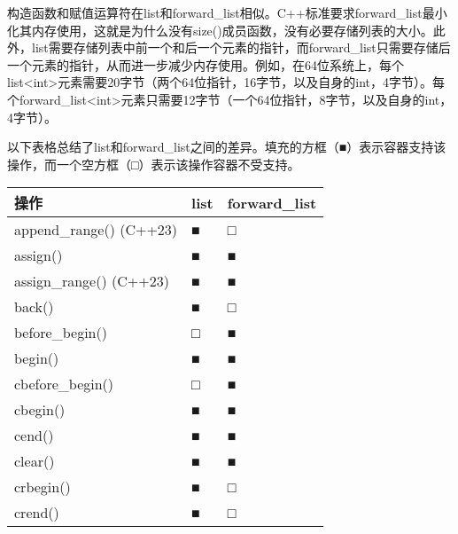 构造函数和赋值运算符在list和forward\_list相似。C++标准要求forward\_list最小化其内存使用，这就是为什么没有size()成员函数，没有必要存储列表的大小。此外，list需要存储列表中前一个和后一个元素的指针，而forward\_list只需要存储后一个元素的指针，从而进一步减少内存使用。例如，在64位系统上，每个list<int>元素需要20字节（两个64位指针，16字节，以及自身的int，4字节）。每个forward\_list<int>元素只需要12字节（一个64位指针，8字节，以及自身的int，4字节）。

以下表格总结了list和forward\_list之间的差异。填充的方框（■）表示容器支持该操作，而一个空方框（□）表示该操作容器不受支持。

\begin{longtable}{|l|l|l|}
\hline
\textbf{操作}                           & \textbf{list} & \textbf{forward\_list} \\ \hline
\endfirsthead
%
\endhead
%
append\_range() (C++23)                      & ■             & □                      \\ \hline
assign()                                     & ■             & ■                      \\ \hline
assign\_range() (C++23)                      & ■             & ■                      \\ \hline
back()                                       & ■             & □                      \\ \hline
before\_begin()                              & □             & ■                      \\ \hline
begin()                                      & ■             & ■                      \\ \hline
cbefore\_begin()                             & □             & ■                      \\ \hline
cbegin()                                     & ■             & ■                      \\ \hline
cend()                                       & ■             & ■                      \\ \hline
clear()                                      & ■             & ■                      \\ \hline
crbegin()                                    & ■             & □                      \\ \hline
crend()                                      & ■             & □                      \\ \hline

\end{longtable}
